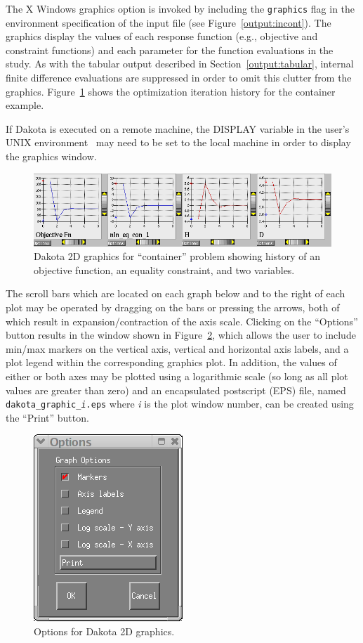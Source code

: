 The X Windows graphics option is invoked by including the
\texttt{graphics} flag in the environment specification of the input
file (see Figure~\ref{output:incont}). The graphics display the values
of each response function (e.g., objective and constraint functions)
and each parameter for the function evaluations in the study. As with
the tabular output described in Section~\ref{output:tabular}, internal
finite difference evaluations are suppressed in order to omit this
clutter from the graphics.  Figure~\ref{output:2dcont} shows the
optimization iteration history for the container example.

If Dakota is executed on a remote machine, the DISPLAY variable in the
user's UNIX environment~\cite{Gil92} may need to be set to the local
machine in order to display the graphics window. 

\begin{figure}
\centering
\includegraphics[width=\textwidth]{images/container_graphic}
\caption{Dakota 2D graphics for ``container'' problem showing history of
an objective function, an equality constraint, and two variables.}
\label{output:2dcont}
\end{figure}

The scroll bars which are located on each graph below and to the right
of each plot may be operated by dragging on the bars or pressing the
arrows, both of which result in expansion/contraction of the axis
scale. Clicking on the ``Options'' button results in the window shown
in Figure~\ref{output:2dcontoptions}, which allows the user to include
min/max markers on the vertical axis, vertical and horizontal axis
labels, and a plot legend within the corresponding graphics plot.  In
addition, the values of either or both axes may be plotted using a
logarithmic scale (so long as all plot values are greater than zero)
and an encapsulated postscript (EPS) file, named 
\texttt{dakota\_graphic\_\emph{i}.eps} where \emph{i} is the plot 
window number, can be created using the ``Print'' button.
\begin{figure}
\centering
\includegraphics[scale=0.6]{images/container_graphic_options}
\caption{Options for Dakota 2D graphics.}
\label{output:2dcontoptions}
\end{figure}


